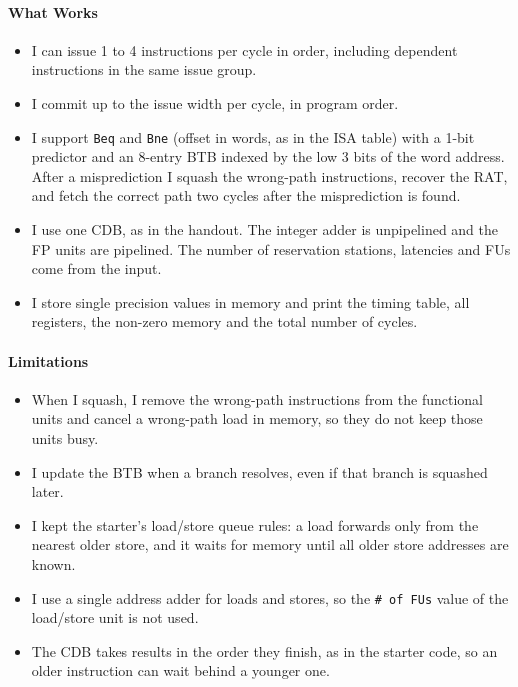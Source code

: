 \documentclass[11pt]{article}
\renewcommand{\_}{\origunderscore\allowbreak}
\begin{document}
\paragraph{What Works}
\begin{itemize}
  \item I can issue 1 to 4 instructions per cycle in order, including dependent instructions in
        the same issue group.
  \item I commit up to the issue width per cycle, in program order.
  \item I support \texttt{Beq} and \texttt{Bne} (offset in words, as in the ISA table) with a
        1-bit predictor and an 8-entry BTB indexed by the low 3 bits of the word address. After
        a misprediction I squash the wrong-path instructions, recover the RAT, and fetch the
        correct path two cycles after the misprediction is found.
  \item I use one CDB, as in the handout. The integer adder is unpipelined and the FP units are
        pipelined. The number of reservation stations, latencies and FUs come from the input.
  \item I store single precision values in memory and print the timing table, all registers,
        the non-zero memory and the total number of cycles.
\end{itemize}

\paragraph{Limitations}
\begin{itemize}
  \item When I squash, I remove the wrong-path instructions from the functional units and cancel
        a wrong-path load in memory, so they do not keep those units busy.
  \item I update the BTB when a branch resolves, even if that branch is squashed later.
  \item I kept the starter's load/store queue rules: a load forwards only from the nearest older
        store, and it waits for memory until all older store addresses are known.
  \item I use a single address adder for loads and stores, so the \texttt{\# of FUs} value of the
        load/store unit is not used.
  \item The CDB takes results in the order they finish, as in the starter code, so an older
        instruction can wait behind a younger one.
\end{itemize}
\end{document}
